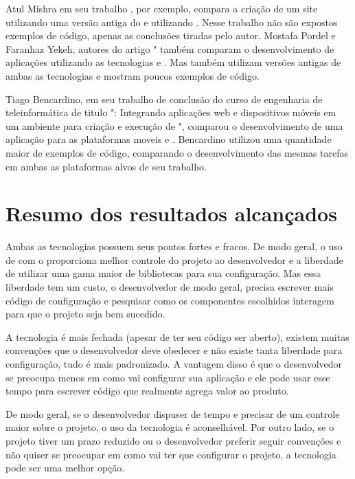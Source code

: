 Atul Mishra em seu trabalho , por exemplo, compara a criação de um site utilizando uma versão antiga do  e utilizando . Nesse trabalho não são expostos exemplos de código, apenas as conclusões tiradas pelo autor. Mostafa Pordel e Faranhaz Yekeh, autores do artigo " também comparam o desenvolvimento de aplicações  utilizando as tecnologias  e . Mas também utilizam versões antigas de ambas as tecnologias e mostram poucos exemplos de código.

Tiago Bencardino, em seu trabalho de conclusão do curso de engenharia de teleinformática de titulo ": Integrando aplicações web e dispositivos móveis em um ambiente para criação e execução de ", comparou o desenvolvimento de uma aplicação para as plataformas moveis  e . Bencardino utilizou uma quantidade maior de exemplos de código, comparando o desenvolvimento das mesmas tarefas em ambas as plataformas alvos de seu trabalho.

\section{Resumo dos resultados alcançados}
\label{sec:resumoresultados}

Ambas as tecnologias possuem seus pontos fortes e fracos. De modo geral, o uso de  com o  proporciona melhor controle do projeto ao desenvolvedor e a liberdade de utilizar uma gama maior de bibliotecas para sua configuração. Mas essa liberdade tem um custo, o desenvolvedor de modo geral, precisa escrever mais código de configuração e pesquisar como os componentes escolhidos interagem para que o projeto seja bem sucedido.

A tecnologia  é mais fechada (apesar de ter seu código ser aberto), existem muitas convenções que o desenvolvedor deve obedecer e não existe tanta liberdade para configuração, tudo é mais padronizado. A vantagem disso é que o desenvolvedor se preocupa menos em como vai configurar sua aplicação e ele pode usar esse tempo para escrever código que realmente agrega valor ao produto.

De modo geral, se o desenvolvedor dispuser de tempo e precisar de um controle maior sobre o projeto, o uso da tecnologia  é aconselhável. Por outro lado, se o projeto tiver um prazo reduzido ou o desenvolvedor preferir seguir convenções e não quiser se preocupar em como vai ter que configurar o projeto, a tecnologia  pode ser uma melhor opção.
 
